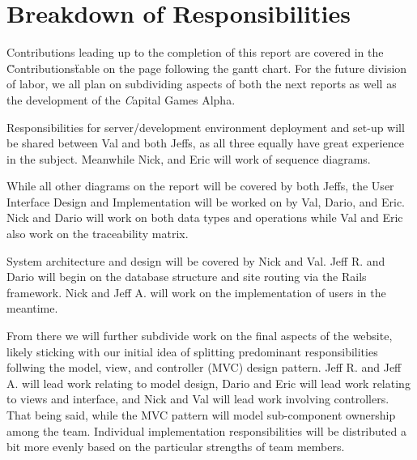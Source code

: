 \section{Breakdown of Responsibilities}

Contributions leading up to the completion of this report are covered in the 
\"Contributions\" table on the page following the gantt chart. For the future
division of labor, we all plan on subdividing aspects of both the next reports 
as well as the development of the {\textit Capital Games} Alpha. 

Responsibilities for server/development environment deployment and set-up will be shared between Val and both Jeffs, as all three equally have great experience in the subject. Meanwhile Nick, and Eric will work of sequence diagrams.

While all other diagrams on the report will be covered by both Jeffs, the User Interface Design and Implementation will be worked on by Val, Dario, and Eric. Nick and Dario will work on both data types and operations while Val and Eric also work on the traceability matrix. 

System architecture and design will be covered by Nick and Val. Jeff R. and Dario will begin on the database structure and site routing via the Rails framework. Nick and Jeff A. will work on the implementation of users in the meantime.

From there we will further subdivide work on the final aspects of the website, likely sticking with our initial idea of splitting predominant responsibilities follwing the model, view, and controller (MVC) design pattern. Jeff R. and Jeff A. will lead work relating to model design, Dario and Eric will lead work relating to views and interface, and Nick and Val will lead work involving controllers. That being said, while the MVC pattern will model sub-component ownership among the team. Individual implementation responsibilities will be distributed a bit more evenly based on the particular strengths of team members.

